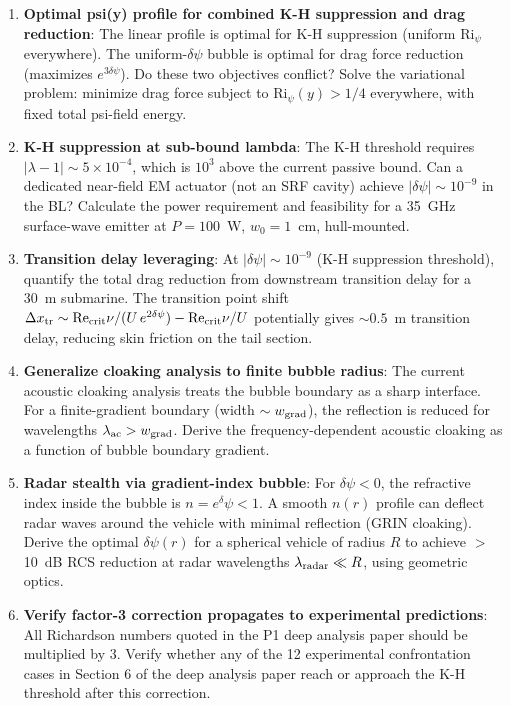 \documentclass[11pt,twocolumn]{article}
\newcommand{\dpsi}{\delta\psi}
\newcommand{\lam}{\lambda}
\newcommand{\Rey}{\mathrm{Re}}
\newcommand{\Ri}{\mathrm{Ri}}
\begin{document}
\begin{enumerate}

\item \textbf{Optimal psi(y) profile for combined K-H suppression and drag
  reduction}: The linear profile is optimal for K-H suppression (uniform
  $\Ri_\psi$ everywhere). The uniform-$\dpsi$ bubble is optimal for drag
  force reduction (maximizes $e^{3\dpsi}$). Do these two objectives
  conflict? Solve the variational problem: minimize drag force subject to
  $\Ri_\psi(y) > 1/4$ everywhere, with fixed total psi-field energy.

\item \textbf{K-H suppression at sub-bound lambda}: The K-H threshold
  requires $|\lam-1| \sim 5\times10^{-4}$, which is $10^3$ above the
  current passive bound. Can a dedicated near-field EM actuator (not an
  SRF cavity) achieve $|\dpsi| \sim 10^{-9}$ in the BL? Calculate the
  power requirement and feasibility for a 35~GHz surface-wave emitter at
  $P = 100$~W, $w_0 = 1$~cm, hull-mounted.

\item \textbf{Transition delay leveraging}: At $|\dpsi| \sim 10^{-9}$
  (K-H suppression threshold), quantify the total drag reduction from
  downstream transition delay for a 30~m submarine. The transition point
  shift $\Delta x_{\rm tr} \sim \Rey_{\rm crit}\nu/(U\,e^{2\dpsi}) -
  \Rey_{\rm crit}\nu/U$ potentially gives $\sim 0.5$~m transition delay,
  reducing skin friction on the tail section.

\item \textbf{Generalize cloaking analysis to finite bubble radius}: The
  current acoustic cloaking analysis treats the bubble boundary as a sharp
  interface. For a finite-gradient boundary (width $\sim w_{\rm grad}$),
  the reflection is reduced for wavelengths $\lambda_{\rm ac} > w_{\rm grad}$.
  Derive the frequency-dependent acoustic cloaking as a function of
  bubble boundary gradient.

\item \textbf{Radar stealth via gradient-index bubble}: For $\dpsi < 0$,
  the refractive index inside the bubble is $n = e^\dpsi < 1$. A smooth
  $n(r)$ profile can deflect radar waves around the vehicle with minimal
  reflection (GRIN cloaking). Derive the optimal $\dpsi(r)$ for a spherical
  vehicle of radius $R$ to achieve $>$10~dB RCS reduction at radar wavelengths
  $\lambda_{\rm radar} \ll R$, using geometric optics.

\item \textbf{Verify factor-3 correction propagates to experimental
  predictions}: All Richardson numbers quoted in the P1 deep analysis
  paper should be multiplied by 3. Verify whether any of the 12 experimental
  confrontation cases in Section 6 of the deep analysis paper reach or
  approach the K-H threshold after this correction.


\end{enumerate}
\end{document}
